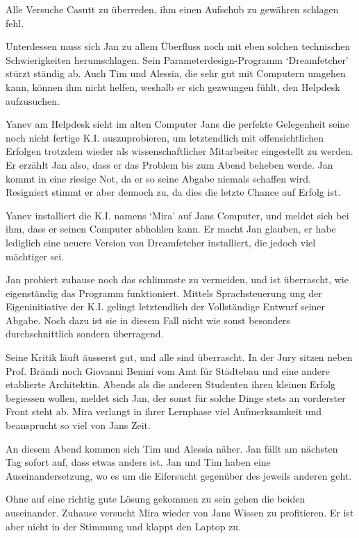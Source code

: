 \documentclass[11pt,a4paper,ngerman]{scrreprt}
\begin{document}
Alle Versuche Casutt zu überreden, ihm einen Aufschub zu gewähren schlagen
fehl.

Unterdessen muss sich Jan zu allem Überfluss noch mit eben solchen technischen
Schwierigkeiten herumschlagen. Sein Parameterdesign-Programm `Dreamfetcher'
stürzt ständig ab. Auch Tim und Alessia, die sehr gut mit Computern umgehen
kann, können ihm nicht helfen, weshalb er sich gezwungen fühlt, den Helpdesk
aufzusuchen.

Yanev am Helpdesk sieht im alten Computer Jans die perfekte Gelegenheit seine
noch nicht fertige K.I. auszuprobieren, um letztendlich mit offensichtlichen
Erfolgen trotzdem wieder als wissenschaftlicher Mitarbeiter eingestellt zu
werden. Er erzählt Jan also, dass er das Problem bis zum Abend beheben
werde. Jan kommt in eine riesige Not, da er so seine Abgabe niemals schaffen
wird. Resigniert stimmt er aber dennoch zu, da dies die letzte Chance auf Erfolg
ist.

Yanev installiert die K.I. namens `Mira' auf Jans Computer, und meldet sich bei
ihm, dass er seinen Computer abhohlen kann. Er macht Jan glauben, er habe
lediglich eine neuere Version von Dreamfetcher installiert, die jedoch viel
mächtiger sei.

Jan probiert zuhause noch das schlimmste zu vermeiden, und ist überrascht, wie
eigenständig das Programm funktioniert. Mittels Sprachsteuerung ung der
Eigeninitiative der K.I. gelingt letztendlich der Vollständige Entwurf seiner
Abgabe. Noch dazu ist sie in diesem Fall nicht wie sonst besonders
durchschnittlich sondern überragend.

Seine Kritik läuft äusserst gut, und alle sind überrascht. In der Jury sitzen
neben Prof. Brändi noch Giovanni Benini vom Amt für Städtebau und eine andere
etablierte Architektin. Abends als die anderen Studenten ihren kleinen Erfolg
begiessen wollen, meldet sich Jan, der sonst für solche Dinge stets an
vorderster Front steht ab. Mira verlangt in ihrer Lernphase viel Aufmerksamkeit
und beansprucht so viel von Jans Zeit.

An diesem Abend kommen sich Tim und Alessia näher. Jan fällt am nächsten Tag
sofort auf, dass etwas anders ist. Jan und Tim haben eine Auseinandersetzung, wo
es um die Eifersucht gegenüber des jeweils anderen geht.

Ohne auf eine richtig gute Lösung gekommen zu sein gehen die beiden
auseinander. Zuhause versucht Mira wieder von Jans Wissen zu profitieren. Er ist
aber nicht in der Stimmung und klappt den Laptop zu.
\end{document}
